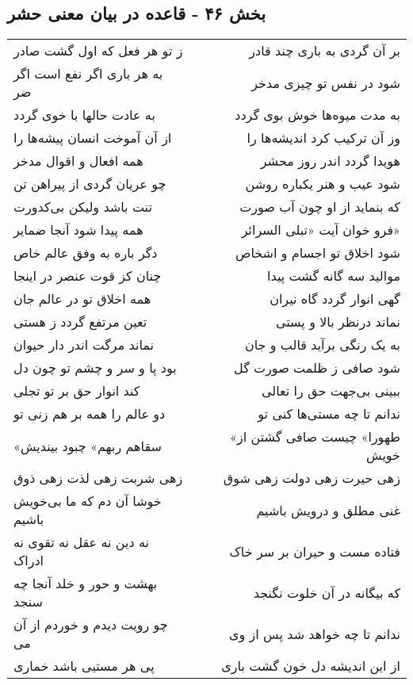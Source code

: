 \begin{center}
\section*{بخش ۴۶ - قاعده در بیان معنی حشر}
\label{sec:sh046}
\begin{longtable}{l p{0.5cm} r}
ز تو هر فعل که اول گشت صادر
&&
بر آن گردی به باری چند قادر
\\
به هر باری اگر نفع است اگر ضر
&&
شود در نفس تو چیزی مدخر
\\
به عادت حالها با خوی گردد
&&
به مدت میوه‌ها خوش بوی گردد
\\
از آن آموخت انسان پیشه‌ها را
&&
وز آن ترکیب کرد اندیشه‌ها را
\\
همه افعال و اقوال مدخر
&&
هویدا گردد اندر روز محشر
\\
چو عریان گردی از پیراهن تن
&&
شود عیب و هنر یکباره روشن
\\
تنت باشد ولیکن بی‌کدورت
&&
که بنماید از او چون آب صورت
\\
همه پیدا شود آنجا ضمایر
&&
فرو خوان آیت «تبلی السرائر»
\\
دگر باره به وفق عالم خاص
&&
شود اخلاق تو اجسام و اشخاص
\\
چنان کز قوت عنصر در اینجا
&&
موالید سه گانه گشت پیدا
\\
همه اخلاق تو در عالم جان
&&
گهی انوار گردد گاه نیران
\\
تعین مرتفع گردد ز هستی
&&
نماند درنظر بالا و پستی
\\
نماند مرگت اندر دار حیوان
&&
به یک رنگی برآید قالب و جان
\\
بود پا و سر و چشم تو چون دل
&&
شود صافی ز ظلمت صورت گل
\\
کند انوار حق بر تو تجلی
&&
ببینی بی‌جهت حق را تعالی
\\
دو عالم را همه بر هم زنی تو
&&
ندانم تا چه مستی‌ها کنی تو
\\
«سقاهم ربهم» چبود بیندیش
&&
«طهورا» چیست صافی گشتن از خویش
\\
زهی شربت زهی لذت زهی ذوق
&&
زهی حیرت زهی دولت زهی شوق
\\
خوشا آن دم که ما بی‌خویش باشیم
&&
غنی مطلق و درویش باشیم
\\
نه دین نه عقل نه تقوی نه ادراک
&&
فتاده مست و حیران بر سر خاک
\\
بهشت و حور و خلد آنجا چه سنجد
&&
که بیگانه در آن خلوت نگنجد
\\
چو رویت دیدم و خوردم از آن می
&&
ندانم تا چه خواهد شد پس از وی
\\
پی هر مستیی باشد خماری
&&
از این اندیشه دل خون گشت باری
\\
\end{longtable}
\end{center}
